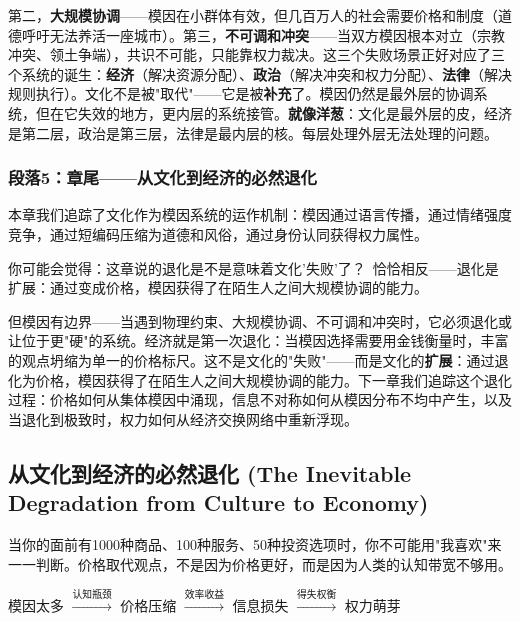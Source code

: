 \documentclass[../main.tex]{subfiles}
\begin{document}
第二，\textbf{大规模协调}——模因在小群体有效，但几百万人的社会需要价格和制度（道德呼吁无法养活一座城市）。第三，\textbf{不可调和冲突}——当双方模因根本对立（宗教冲突、领土争端），共识不可能，只能靠权力裁决。这三个失败场景正好对应了三个系统的诞生：\textbf{经济}（解决资源分配）、\textbf{政治}（解决冲突和权力分配）、\textbf{法律}（解决规则执行）。文化不是被"取代"——它是被\textbf{补充}了。模因仍然是最外层的协调系统，但在它失效的地方，更内层的系统接管。\textbf{就像洋葱}：文化是最外层的皮，经济是第二层，政治是第三层，法律是最内层的核。每层处理外层无法处理的问题。

	\subsubsection*{段落5：章尾——从文化到经济的必然退化}

	本章我们追踪了文化作为模因系统的运作机制：模因通过语言传播，通过情绪强度竞争，通过短编码压缩为道德和风俗，通过身份认同获得权力属性。

	\begin{tcolorbox}[colback=yellow!5, title=\textit{读者行为预测}]

		你可能会觉得：这章说的退化是不是意味着文化'失败'了？\ 恰恰相反——退化是扩展：通过变成价格，模因获得了在陌生人之间大规模协调的能力。

	\end{tcolorbox}

但模因有边界——当遇到物理约束、大规模协调、不可调和冲突时，它必须退化或让位于更"硬"的系统。经济就是第一次退化：当模因选择需要用金钱衡量时，丰富的观点坍缩为单一的价格标尺。这不是文化的"失败"——而是文化的\textbf{扩展}：通过退化为价格，模因获得了在陌生人之间大规模协调的能力。下一章我们追踪这个退化过程：价格如何从集体模因中涌现，信息不对称如何从模因分布不均中产生，以及当退化到极致时，权力如何从经济交换网络中重新浮现。

	\subsection{从文化到经济的必然退化 (The Inevitable Degradation from Culture to Economy)}

	\begin{motivation}

		当你的面前有1000种商品、100种服务、50种投资选项时，你不可能用"我喜欢"来一一判断。价格取代观点，不是因为价格更好，而是因为人类的认知带宽不够用。

	\end{motivation}

	\begin{logicmap}

		模因太多 $\xrightarrow{\text{认知瓶颈}}$ 价格压缩 $\xrightarrow{\text{效率收益}}$ 信息损失 $\xrightarrow{\text{得失权衡}}$ 权力萌芽

	\end{logicmap}
\end{document}
